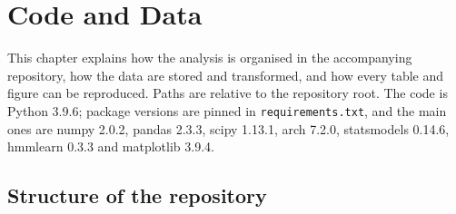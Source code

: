 \section{Code and Data}\label{ch:code}

This chapter explains how the analysis is organised in the accompanying repository, how the data are stored and transformed, and how every table and figure can be reproduced. Paths are relative to the repository root. The code is Python 3.9.6; package versions are pinned in \texttt{requirements.txt}, and the main ones are numpy 2.0.2, pandas 2.3.3, scipy 1.13.1, arch 7.2.0, statsmodels 0.14.6, hmmlearn 0.3.3 and matplotlib 3.9.4.

\subsection{Structure of the repository}\label{sec:code-structure}

